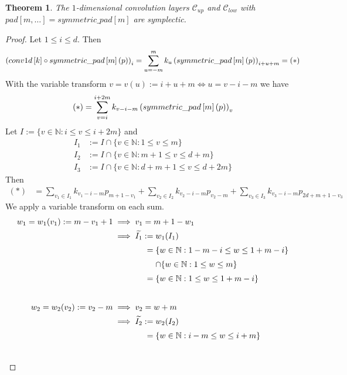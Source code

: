 \documentclass[twoside,a4paper]{article}
\newtheorem{theorem}{Theorem}
\begin{document}
\begin{theorem}
	The $1$-dimensional convolution layers $\mathcal{C}_{up}$ and $\mathcal{C}_{low}$
	with $pad[m,\dots] = symmetric\_pad[m]$ are symplectic.
\end{theorem}
\begin{proof}
	Let $1 \leq i \leq d$.
	Then
	\begin{equation*}
		\left( conv1d \left[ k \right] \circ symmetric\_pad \left[ m \right](p) \right)_i
		= \sum_{u=-m}^m k_u \left( symmetric\_pad \left[ m \right](p) \right)_{i+u+m} = (*)
	\end{equation*}
	With the variable transform $v=v(u):=i+u+m \iff u=v-i-m$ we have
	\begin{equation*}
		(*) = \sum_{v=i}^{i+2m} k_{v-i-m} \left( symmetric\_pad \left[ m \right](p) \right)_{v}
	\end{equation*}
	Let $I := \{ v \in \mathbb{N} : i \leq v \leq i+2m \}$ and
	\begin{align*}
		I_1 &:= I \cap \{ v \in \mathbb{N} : 1 \leq v \leq m \} \\
		I_2 &:= I \cap \{ v \in \mathbb{N} : m+1 \leq v \leq d+m \} \\
		I_3 &:= I \cap \{ v \in \mathbb{N} : d+m+1 \leq v \leq d+2m \}
	\end{align*}
	Then
	\begin{align*}
		(*) &= \sum_{v_1 \in I_1} k_{v_1-i-m} p_{m+1-v_1} +
		\sum_{v_2 \in I_2} k_{v_2-i-m} p_{v_2-m} +
		\sum_{v_3 \in I_3} k_{v_3-i-m} p_{2d+m+1-v_3}
	\end{align*}
	We apply a variable transform on each sum.
	\begin{align*}
		w_1 = w_1(v_1) := m-v_1+1 &\implies v_1=m+1-w_1 \\
		&\implies \widetilde{I_1} := w_1(I_1) \\
		& \phantomrel{\implies \widetilde{I_1} :}
		= \{ w \in \mathbb{N} : 1-m-i \leq w \leq 1+m-i \} \\
		& \phantomrel{\implies \widetilde{I_1} :=}
		\cap \{ w \in \mathbb{N} : 1 \leq w \leq m \}  \\
		& \phantomrel{\implies \widetilde{I_1} :}
		= \{ w \in \mathbb{N} : 1 \leq w \leq 1+m-i \} \\[20pt]
		w_2 = w_2(v_2) := v_2-m &\implies v_2=w+m \\
		&\implies \widetilde{I_2} := w_2(I_2) \\
		&\phantomrel{\implies \widetilde{I_2} :}
		= \{ w \in \mathbb{N} : i-m \leq w \leq i+m \} \\
		& \phantomrel{\implies \widetilde{I_2} :=}

\end{align*}
\end{proof}
\end{document}
